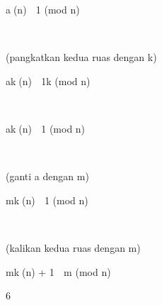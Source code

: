 \documentclass{article}
\begin{document}

a(n)  1 (mod n) 

      

(pangkatkan kedua ruas dengan k)

ak(n)  1k (mod n)

    

ak(n)  1 (mod n)

       

(ganti a dengan m)

mk(n)  1 (mod n)

       

(kalikan kedua ruas dengan m)

mk(n) + 1  m (mod n)







6
\end{document}
